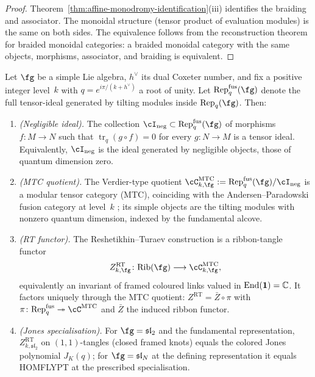 \begin{proof}
Theorem~\ref{thm:affine-monodromy-identification}(iii) identifies the braiding and associator. The monoidal structure (tensor product of evaluation modules) is the same on both sides. The equivalence follows from the reconstruction theorem for braided monoidal categories: a braided monoidal category with the same objects, morphisms, associator, and braiding is equivalent.
\end{proof}

\begin{proposition}
\label{prop:rt-functor-via-negligible-quotient}
Let $\fg$ be a simple Lie algebra, $h^\vee$ its dual Coxeter number, and fix a positive integer level~$k$ with $q = e^{i\pi/(k+h^\vee)}$ a root of unity. Let $\mathrm{Rep}_q^{\mathrm{fus}}(\fg)$ denote the full tensor-ideal generated by tilting modules inside $\mathrm{Rep}_q(\fg)$. Then:
\begin{enumerate}[label=\textup{(\roman*)}]
 \item \emph{(Negligible ideal).} The collection $\cI_{\mathrm{neg}} \subset \mathrm{Rep}_q^{\mathrm{fus}}(\fg)$ of morphisms $f \colon M \to N$ such that $\operatorname{tr}_q(g \circ f) = 0$ for every $g \colon N \to M$ is a tensor ideal. Equivalently, $\cI_{\mathrm{neg}}$ is the ideal generated by negligible objects, those of quantum dimension zero.
 \item \emph{(MTC quotient).} The Verdier-type quotient $\cC^{\mathrm{MTC}}_{k,\fg} := \mathrm{Rep}_q^{\mathrm{fus}}(\fg) / \cI_{\mathrm{neg}}$ is a modular tensor category (MTC), coinciding with the Andersen--Paradowski fusion category at level~$k$ \cite{And92,AP95}; its simple objects are the tilting modules with nonzero quantum dimension, indexed by the fundamental alcove.
 \item \emph{(RT functor).} The Reshetikhin--Turaev construction \cite{RT90} is a ribbon-tangle functor
 \[
 Z^{\mathrm{RT}}_{k,\fg} \colon \mathrm{Rib}(\fg) \longrightarrow \cC^{\mathrm{MTC}}_{k,\fg},
 \]
 equivalently an invariant of framed coloured links valued in $\operatorname{End}(\mathbf{1}) = \mathbb C$. It factors uniquely through the MTC quotient: $Z^{\mathrm{RT}} = \bar{Z} \circ \pi$ with $\pi \colon \mathrm{Rep}_q^{\mathrm{fus}} \twoheadrightarrow \cC^{\mathrm{MTC}}$ and $\bar{Z}$ the induced ribbon functor.
 \item \emph{(Jones specialisation).} For $\fg = \mathfrak{sl}_2$ and the fundamental representation, $Z^{\mathrm{RT}}_{k,\mathfrak{sl}_2}$ on $(1,1)$-tangles (closed framed knots) equals the colored Jones polynomial $J_K(q)$; for $\fg = \mathfrak{sl}_N$ at the defining representation it equals HOMFLYPT at the prescribed specialisation.

\end{enumerate}
\end{proposition}
